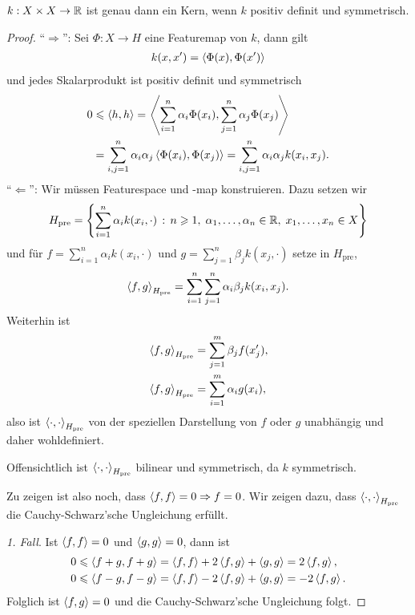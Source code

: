 \begin{prop}
\label{prop:5.1.11}
$k: X\times X\to\mathbb{R}$ ist genau dann ein Kern, wenn $k$ positiv definit und
symmetrisch.\fishhere
\end{prop}
\begin{proof}
"`$\Rightarrow$"': Sei $\Phi: X\to H$ eine Featuremap von $k$, dann gilt
\begin{align*}
k(x,x') = \left\langle\Phi(x),\Phi(x')\right\rangle
\end{align*}
und jedes Skalarprodukt ist positiv definit und symmetrisch
\begin{align*}
0 &\leqslant \left\langle h,h\right\rangle = \left\langle\sum_{i=1}^n \alpha_i\Phi(x_i),\sum_{j=1}^n \alpha_j
\Phi(x_j) \right\rangle\\
&=
\sum_{i,j=1}^n \alpha_i \alpha_j \left\langle\Phi(x_i),\Phi(x_j)\right\rangle
= 
\sum_{i,j=1}^n \alpha_i \alpha_j k(x_i,x_j).
\end{align*}
"`$\Leftarrow$"':
Wir müssen Featurespace und -map konstruieren. Dazu setzen wir
\begin{align*}
H_\mathrm{pre} = \left\{ \sum_{i=1}^n \alpha_i k(x_i,\cdot)\,:\,n\geqslant 1,\;
\alpha_1,\ldots,\alpha_n\in\mathbb{R},\; x_1,\ldots,x_n\in X\right\}
\end{align*}
und für $f=\sum_{i=1}^n \alpha_i k(x_i,\cdot)$ und $g=\sum_{j=1}^n \beta_j
k(x_j,\cdot)$ setze in $H_\mathrm{pre}$,
\begin{align*}
\left\langle f,g\right\rangle_{H_\mathrm{pre}} = 
\sum_{i=1}^n\sum_{j=1}^n \alpha_i \beta_j k(x_i,x_j).
\end{align*}
Weiterhin ist
\begin{align*}
&\left\langle f,g\right\rangle_{H_\mathrm{pre}} = 
\sum_{j=1}^m \beta_j f(x_j'),\\
&\left\langle f,g\right\rangle_{H_\mathrm{pre}} = 
\sum_{i=1}^m \alpha_i g(x_i),
\end{align*}
also ist $\left\langle\cdot,\cdot\right\rangle_{H_\mathrm{pre}}$ von der speziellen Darstellung von
$f$ oder $g$ unabhängig und daher wohldefiniert.

Offensichtlich ist $\left\langle\cdot,\cdot\right\rangle_{H_\mathrm{pre}}$ bilinear und
symmetrisch, da $k$ symmetrisch.

Zu zeigen ist also noch, dass $\left\langle f,f\right\rangle=0\Rightarrow f=0$. Wir zeigen dazu,
dass $\left\langle\cdot,\cdot\right\rangle_{H_\mathrm{pre}}$ die Cauchy-Schwarz'sche Ungleichung
erfüllt.

\textit{1. Fall}. Ist $\left\langle f,f\right\rangle=0$ und $\left\langle g,g\right\rangle = 0$, dann ist
\begin{align*}
&0\leqslant \left\langle f+g,f+g\right\rangle = \left\langle f,f\right\rangle + 2\left\langle f,g\right\rangle + \left\langle g,g\right\rangle = 2\left\langle f,g\right\rangle,\\
&0\leqslant \left\langle f-g,f-g\right\rangle = \left\langle f,f\right\rangle - 2\left\langle f,g\right\rangle + \left\langle g,g\right\rangle = -2\left\langle f,g\right\rangle.
\end{align*}
Folglich ist $\left\langle f,g\right\rangle=0$ und die Cauchy-Schwarz'sche Ungleichung folgt. 


\end{proof}
